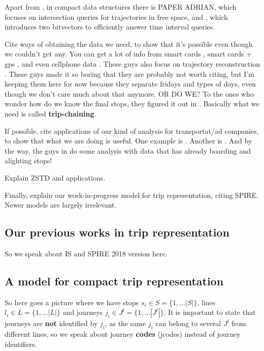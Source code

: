 \documentclass[runningheads]{llncs}
\begin{document}
Apart from \cite{koide2018cinct}, in compact data structures there is PAPER ADRIAN, which focuses on intersection queries for trajectories in free space, and  \cite{rivera2018faster}, which introduces two bitvectors to efficiently answer time interval queries.

Cite ways of obtaining the data we need, to show that it's possible even though we couldn't get any. You can get a lot of info from smart cards \cite{bhaskar2015passenger}, smart cards + gps \cite{ma2014development}, and even cellphone data \cite{liu2017exploring}. These guys also focus on trajectory reconstruction \cite{tao2014exploring}. These guys \cite{wang2014aggregated} made it so boring that they are probably not worth citing, but I'm keeping them here for now because they separate fridays and types of days, even though we don't care much about that anymore. OR DO WE? To the ones who wonder how do we know the final stops, they figured it out in \cite{alsger2016validating}. Basically what we need is called \textbf{trip-chaining}.

If possible, cite applications of our kind of analysis for transportat/ad companies, to show that what we are doing is useful. One example is \cite{tu2018spatial}. Another is \cite{zhang2017targeted}. And by the way, the guys in \cite{weng2018mining} do some analysis with data that has already boarding and alighting stops!

Explain ZSTD and applications.

Finally, explain our work-in-progress model for trip representation, citing SPIRE. Newer models are largely irrelevant.

\subsection{Our previous works in trip representation}
So we speak about IS and SPIRE 2018 version here.

\subsection{A model for compact trip representation}
So here goes a picture where we have stops $s_i \in S = \{1,...|S|\}$, lines $l_i \in L = \{1,...|L|\}$ and journeys $j_i \in J^l = \{1,...|J^l|\}$. It is important to state that journeys are \textbf{not} identified by $j_i$, as the same $j_i$ can belong to several $J^l$ from different lines, so we speak about journey \textbf{codes} (jcodes) instead of journey identifiers.
\end{document}
